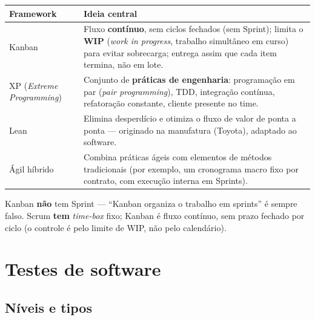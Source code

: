 \begin{conceito}
\begin{center}
\begin{tabular}{@{}p{2.4cm}p{9.8cm}@{}}
\toprule
\textbf{Framework} & \textbf{Ideia central} \\
\midrule
Kanban & Fluxo \textbf{contínuo}, sem ciclos fechados (sem Sprint); limita o
\textbf{WIP} (\textit{work in progress}, trabalho simultâneo em curso) para
evitar sobrecarga; entrega assim que cada item termina, não em lote. \\
XP (\textit{Extreme Programming}) & Conjunto de \textbf{práticas de
engenharia}: programação em par (\textit{pair programming}), TDD,
integração contínua, refatoração constante, cliente presente no time. \\
Lean & Elimina desperdício e otimiza o fluxo de valor de ponta a ponta ---
originado na manufatura (Toyota), adaptado ao software. \\
Ágil híbrido & Combina práticas ágeis com elementos de métodos
tradicionais (por exemplo, um cronograma macro fixo por contrato, com
execução interna em Sprints). \\
\bottomrule
\end{tabular}
\end{center}
\end{conceito}

\begin{cuidado}
Kanban \textbf{não} tem Sprint --- “Kanban organiza o trabalho em sprints”
é sempre falso. Scrum \textbf{tem} \textit{time-box} fixo; Kanban é fluxo
contínuo, sem prazo fechado por ciclo (o controle é pelo limite de WIP, não
pelo calendário).
\end{cuidado}

\section{Testes de software}

\subsection{Níveis e tipos}

